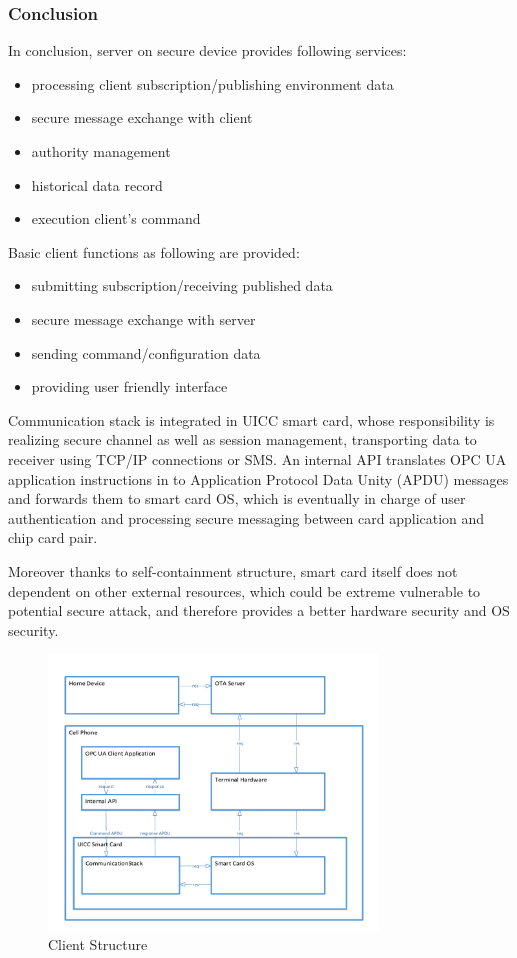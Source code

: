 \subsubsection{Conclusion}
In conclusion, server on secure device provides following services:
 \begin{itemize}
  \item processing client subscription/publishing environment data
  \item secure message exchange with client
  \item authority management
  \item historical data record
  \item execution client's command
\end{itemize}
Basic client functions as following are provided:
 \begin{itemize}
  \item submitting subscription/receiving published data
  \item secure message exchange with server
  \item sending command/configuration data
  \item providing user friendly interface
\end{itemize}

Communication stack is integrated in UICC smart card, whose responsibility is realizing secure channel as well as session management, transporting data to receiver using TCP/IP connections or SMS. An internal API translates OPC UA application instructions in to Application Protocol Data Unity (APDU) messages and forwards them to smart card OS, which is eventually in charge of user authentication and processing secure messaging between card application and chip card pair. 

Moreover thanks to self-containment structure, smart card itself does not dependent on other external resources, which could be extreme vulnerable to potential secure attack, and therefore provides a better hardware security and OS security. 

 \begin{figure}
	\centering
	\includegraphics[width=0.78\textwidth]{clientStructure}
		\caption{Client Structure}
	\label{fig:clientStructure}
\end{figure}

